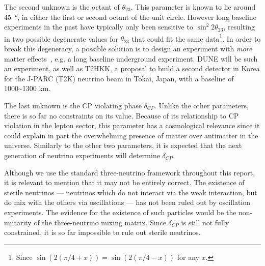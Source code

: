 The second unknown is the octant of $\theta_{23}$. This parameter is known to
lie around \SI{45}{\degree}, in either the first or second octant of the unit
circle. However long baseline experiments in the past have typically only been
sensitive to $\sin^2{2 \theta_{23}}$, resulting in two possible degenerate
values for $\theta_{23}$ that could fit the same data\footnote{Since
$\sin(2(\pi/4+x)) = \sin(2(\pi/4-x))$ for any $x$.}\cite{novat23}.
In order to break this degeneracy, a possible solution is to design an
experiment with \emph{more} matter effects~\cite{raut}, e.g. a long baseline
underground experiment. DUNE will be such an experiment, as well as
T2HKK, a proposal to build a second detector in Korea for the J-PARC (T2K) neutrino
beam in Tokai, Japan, with a baseline of 1000\textasciitilde1300 km\cite{t2hkk}.

The last unknown is the CP violating phase $\delta_{CP}$. Unlike the other
parameters, there is so far no constraints on its value.
Because of its relationship to CP violation in the lepton sector, this
parameter has a cosmological relevance since it could explain in part the
overwhelming presence of matter over antimatter in the universe. Similarly to
the other two parameters, it is expected that the next generation of neutrino
experiments will determine $\delta_{CP}$.

Although we use the standard three-neutrino framework throughout this report,
it is relevant to mention that it may not be entirely correct. The existence of
sterile neutrinos --- neutrinos which do not interact via the weak interaction,
but do mix with the others via oscillations --- has not been ruled out by
oscillation experiments. The evidence for the existence of such particles would
be the non-unitarity of the three-neutrino mixing matrix. Since
$\delta_{CP}$ is still not fully constrained, it is so far impossible to rule out
sterile neutrinos.
